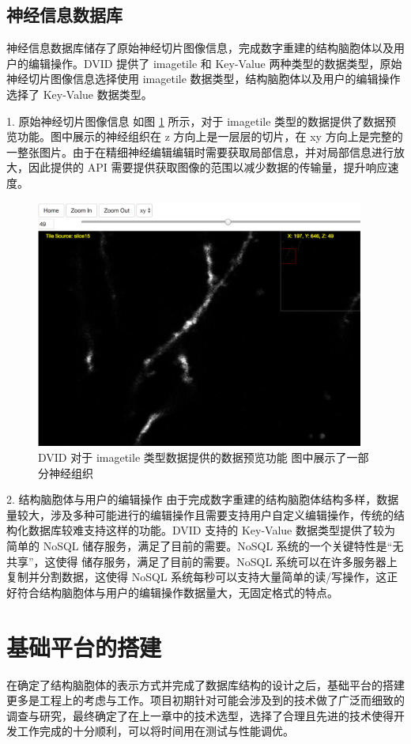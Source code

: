 \subsection{神经信息数据库}
神经信息数据库储存了原始神经切片图像信息，完成数字重建的结构脑胞体以及用户的编辑操作。DVID 提供了 imagetile 和 Key-Value 两种类型的数据类型，原始神经切片图像信息选择使用 imagetile 数据类型，结构脑胞体以及用户的编辑操作选择了 Key-Value 数据类型。

1. 原始神经切片图像信息
如图 \ref{dvid} 所示，对于 imagetile 类型的数据提供了数据预览功能。图中展示的神经组织在 z 方向上是一层层的切片，在 xy 方向上是完整的一整张图片。由于在精细神经编辑编辑时需要获取局部信息，并对局部信息进行放大，因此提供的 API 需要提供获取图像的范围以减少数据的传输量，提升响应速度。

\begin{figure}
\centering
\includegraphics[width=108mm]{images/dvid}
\caption{DVID 对于 imagetile 类型数据提供的数据预览功能 图中展示了一部分神经组织}
\label{dvid}
\end{figure}

2. 结构脑胞体与用户的编辑操作
由于完成数字重建的结构脑胞体结构多样，数据量较大，涉及多种可能进行的编辑操作且需要支持用户自定义编辑操作，传统的结构化数据库较难支持这样的功能。DVID 支持的 Key-Value 数据类型提供了较为简单的 NoSQL 储存服务，满足了目前的需要。NoSQL 系统的一个关键特性是“无共享”，这使得 储存服务，满足了目前的需要。NoSQL 系统可以在许多服务器上复制并分割数据，这使得 NoSQL 系统每秒可以支持大量简单的读/写操作，这正好符合结构脑胞体与用户的编辑操作数据量大，无固定格式的特点。

\section{基础平台的搭建}
在确定了结构脑胞体的表示方式并完成了数据库结构的设计之后，基础平台的搭建更多是工程上的考虑与工作。项目初期针对可能会涉及到的技术做了广泛而细致的调查与研究，最终确定了在上一章中的技术选型，选择了合理且先进的技术使得开发工作完成的十分顺利，可以将时间用在测试与性能调优。

